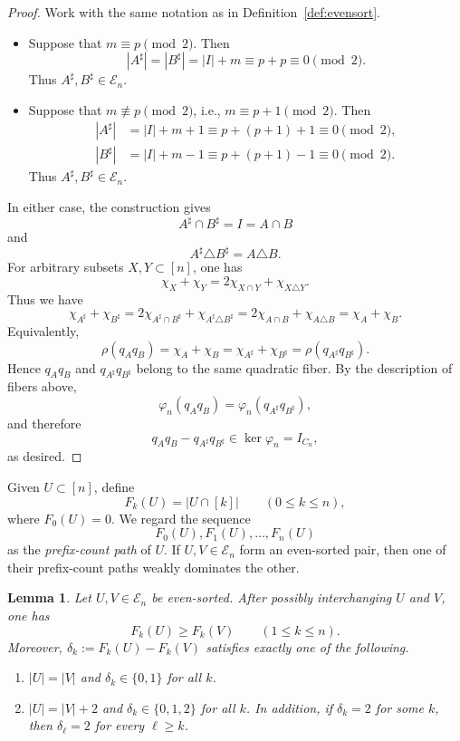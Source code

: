 \documentclass[11pt]{amsart}
\newtheorem{lemma}[theorem]{Lemma}
\theoremstyle{definition}
\newcommand{\En}{\mathcal E_n}
\numberwithin{equation}{section}
\begin{document}
\begin{proof}
Work with the same notation as in Definition~\ref{def:evensort}.
\begin{itemize}
    \item 
Suppose that $m\equiv p\pmod2$. 
Then
\[
 |A^\sharp|
 =
 |B^\sharp|
 =
 |I|+m
 \equiv
 p+p
 \equiv0
 \pmod2.
\]
Thus $A^\sharp,B^\sharp\in\En$.
\item 
Suppose that $m\not\equiv p\pmod2$, i.e., $m\equiv p+1\pmod2$.
Then
\[
 \begin{aligned}
 |A^\sharp|
 &=|I|+m+1\equiv p+(p+1)+1\equiv0\pmod2,\\
 |B^\sharp|
 &=|I|+m-1\equiv p+(p+1)-1\equiv0\pmod2.
 \end{aligned}
\]
Thus $A^\sharp,B^\sharp\in\En$.
\end{itemize}
In either case, the construction gives
\[
 A^\sharp\cap B^\sharp=I=A\cap B
\]
and
\[
 A^\sharp\triangle B^\sharp
 =
 A\triangle B.
\]
For arbitrary subsets $X,Y\subset[n]$, one has
\[
 \chi_X+\chi_Y
 =
 2\chi_{X\cap Y}+\chi_{X\triangle Y}.
\]
Thus we have
\[
 \chi_{A^\sharp}+\chi_{B^\sharp}
 =
 2\chi_{A^\sharp\cap B^\sharp}
 +\chi_{A^\sharp\triangle B^\sharp}
 =
 2\chi_{A\cap B}
 +\chi_{A\triangle B}
 =
 \chi_A+\chi_B.
\]
Equivalently,
\[
 \rho(q_Aq_B)
 =
 \chi_A+\chi_B
 =
 \chi_{A^\sharp}+\chi_{B^\sharp}
 =
 \rho(q_{A^\sharp}q_{B^\sharp}).
\]
Hence $q_Aq_B$ and $q_{A^\sharp}q_{B^\sharp}$ belong to the
same quadratic fiber.  By the description of fibers above,
\[
 \varphi_n(q_Aq_B)
 =
 \varphi_n(q_{A^\sharp}q_{B^\sharp}),
\]
and therefore
\[
 q_Aq_B-q_{A^\sharp}q_{B^\sharp}
 \in\ker\varphi_n=I_{C_n},
\]
as desired.
\end{proof}


Given \(U\subset[n]\), define
$$
F_k(U)=|U\cap[k]|
\qquad (0\le k\le n),
$$
where \(F_0(U)=0\). We regard the sequence
$$
F_0(U),F_1(U),\ldots,F_n(U)
$$
as the \emph{prefix-count path} of \(U\). If \(U,V\in\En\) form an even-sorted pair, then one of their prefix-count paths weakly dominates the other.


\begin{lemma} \label{lem:pairshape}
Let $U,V\in\En$ be even-sorted. 
After possibly interchanging $U$ and $V$, one has
\[
F_k(U)\ge F_k(V)\qquad(1\le k\le n).
\]
Moreover,
$\delta_k:=F_k(U)-F_k(V)$ satisfies exactly one of the following.
\begin{enumerate}[label=\textup{(\roman*)}]
\item $|U|=|V|$ and $\delta_k\in\{0,1\}$ for all $k$.
\item $|U|=|V|+2$ and $\delta_k\in\{0,1,2\}$ for all $k$. In addition, if
$\delta_k=2$ for some $k$, then $\delta_\ell=2$ for every $\ell\ge k$.
\end{enumerate}
\end{lemma}
\end{document}
